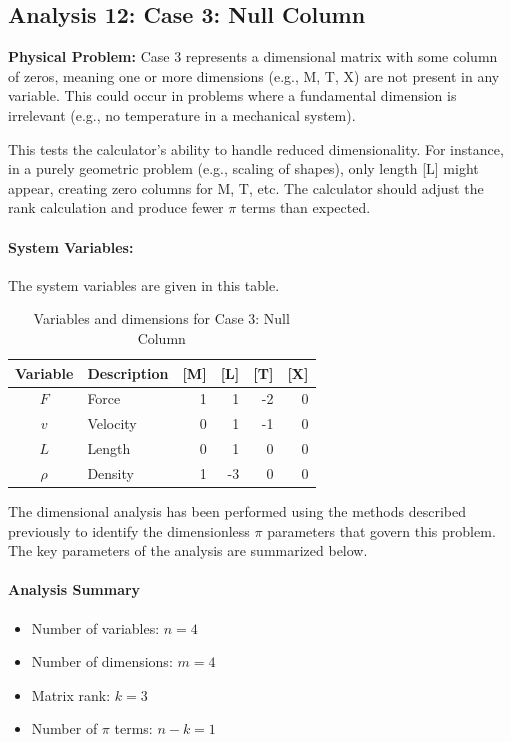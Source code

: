 \subsection{Analysis 12: Case 3: Null Column}
\label{sec:Case_3_Null_Column}

\begin{problembox}
\textbf{Physical Problem:} Case 3 represents a dimensional matrix with some column of zeros, meaning one or more dimensions (e.g., M, T, X) are not present in any variable. This could occur in problems where a fundamental dimension is irrelevant (e.g., no temperature in a mechanical system).
\end{problembox}

This tests the calculator's ability to handle reduced dimensionality. For instance, in a purely geometric problem (e.g., scaling of shapes), only length [L] might appear, creating zero columns for M, T, etc. The calculator should adjust the rank calculation and produce fewer $\pi$ terms than expected.

\paragraph{System Variables: } The system variables are given in this table.

\begin{table}[H]
\centering
\begin{tabular}{|c|l|r|r|r|r|}
\hline
\textbf{Variable} & \textbf{Description} & \textbf{[M]} & \textbf{[L]} & \textbf{[T]} & \textbf{[X]} \\
\hline
$F$ & Force & 1 & 1 & -2 & 0 \\
$v$ & Velocity & 0 & 1 & -1 & 0 \\
$L$ & Length & 0 & 1 & 0 & 0 \\
$\rho$ & Density & 1 & -3 & 0 & 0 \\

\hline
\end{tabular}
\caption{Variables and dimensions for Case 3: Null Column}
\end{table}

The dimensional analysis has been performed using the methods described previously to identify the dimensionless $\pi$ parameters that govern this problem. The key parameters of the analysis are summarized below.

\paragraph{Analysis Summary}
\begin{itemize}
\item Number of variables: $n = 4$
\item Number of dimensions: $m = 4$
\item Matrix rank: $k = 3$
\item Number of $\pi$ terms: $n - k = 1$
\end{itemize}

